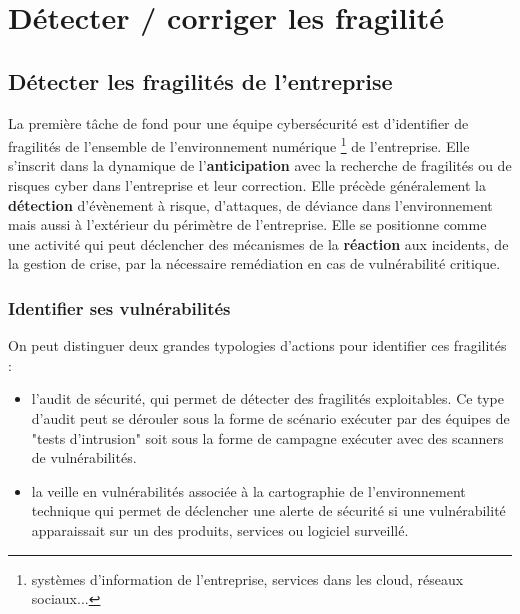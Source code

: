 %
%

\section{Détecter / corriger les fragilité}

\subsection{Détecter les fragilités de l’entreprise}

La première tâche de fond pour une équipe cybersécurité est  d'identifier de fragilités de l'ensemble de l'environnement numérique \footnote{systèmes d'information de l'entreprise, services dans les cloud, réseaux sociaux...} de l'entreprise. Elle s'inscrit dans la dynamique de  l'\textbf{anticipation} avec la recherche de fragilités ou de risques cyber dans l'entreprise et leur correction. Elle précède généralement la \textbf{détection} d'évènement à risque, d'attaques, de déviance dans l'environnement mais aussi à l'extérieur du périmètre de l'entreprise.
Elle se positionne comme une activité  qui peut déclencher des mécanismes de la  \textbf{réaction} aux incidents, de la gestion de crise, par la nécessaire remédiation en cas de vulnérabilité critique.

\begin{frame}
\frametitle<presentation>{Identifier ses vulnérabilités}
On peut distinguer deux grandes typologies d'actions pour identifier ces fragilités :
\begin{itemize}
	\item  l'audit  de sécurité, qui permet de détecter des fragilités exploitables. Ce type d'audit peut se dérouler sous la forme de scénario exécuter par des équipes de "tests d'intrusion" soit sous la forme de campagne exécuter avec des scanners de vulnérabilités.
	\item la veille en vulnérabilités associée à la cartographie de l'environnement technique qui permet de déclencher une alerte de sécurité si une vulnérabilité apparaissait sur un des produits, services ou logiciel surveillé.
\end{itemize}
\end{frame}

